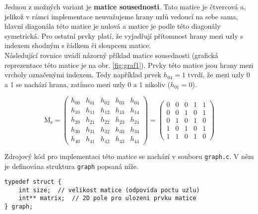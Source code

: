 \documentclass[a4paper]{article}
\begin{document}
        \noindent
        Jednou z možných variant je \textbf{matice sousednosti}. Tato matice je čtvercová a, jelikož v rámci implementace neuvažujeme hrany uzlů vedoucí na sebe sama, hlavní diagonála této matice je nulová a matice je podle této diagonály symetrická. Pro ostatní prvky platí, že vyjadřují přítomnost hrany mezi uzly s indexem shodným s řádkem či sloupcem matice.\\

        \noindent
        Následující rovnice uvádí názorný příklad matice sousednosti (grafická reprezentace této matice je na obr. \ref{fig:graf1}). Prvky této matice jsou hrany mezi vrcholy označenými indexem. Tedy například prvek $h_{04} = 1$ tvrdí, že mezi uzly 0 a 1 se nachází hrana, zatímco mezi uzly 0 a 1 nikoliv ($h_{01} = 0$).

        \begin{equation} \label{eq:adj-mat}
            \mathrm{M_s} = 
            \begin{pmatrix}
                h_{00} & h_{01} & h_{02} & h_{03} & h_{04} \\
                h_{10} & h_{11} & h_{12} & h_{13} & h_{14} \\
                h_{20} & h_{21} & h_{22} & h_{23} & h_{24} \\
                h_{30} & h_{31} & h_{32} & h_{33} & h_{34} \\
                h_{40} & h_{41} & h_{42} & h_{43} & h_{44}
            \end{pmatrix} = 
            \begin{pmatrix}
                0 & 0 & 0 & 1 & 1 \\
                0 & 0 & 1 & 0 & 1 \\
                0 & 1 & 0 & 1 & 0 \\
                1 & 0 & 1 & 0 & 1 \\
                1 & 1 & 0 & 1 & 0
            \end{pmatrix}
        \end{equation}

        \noindent
        Zdrojový kód pro implementaci této matice se nachází v souboru \lstinline{graph.c}. V něm je definována struktura \lstinline{graph} popsaná níže.

        \begin{lstlisting}[caption={Definice struktury neorientovaného grafu.},captionpos=b]
typedef struct {
    int size;  // velikost matice (odpovida poctu uzlu)
    int** matrix;  // 2D pole pro ulozeni prvku matice
} graph;
        \end{lstlisting}
\end{document}
